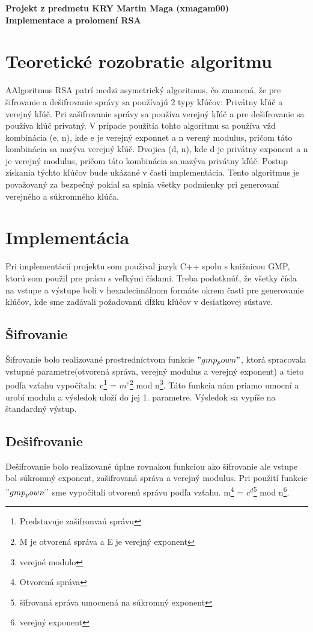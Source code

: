 \documentclass[11pt,a4paper,titlepage,final]{article}
\begin{document}
\raggedright\large{\textbf{Projekt z predmetu KRY Martin Maga (xmagam00) \\Implementace a prolomení RSA}}

\section{Teoretické rozobratie algoritmu}
AAlgoritmus RSA patrí medzi asymetrický algoritmus, čo znamená, že pre šifrovanie a dešifrovanie správy sa používajú 2 typy kľúčov: Privátny kľúč a verejný kľúč. Pri zašifrovanie správy sa používa verejný kľúč a pre dešifrovanie sa používa klúč privatný. V prípade použitia tohto algoritmu sa používa vžd kombinácia (e, n), kde e je verejný exponnet a n verený modulus, pričom táto kombinácia sa nazýva verejný kľúč. Dvojica (d, n), kde d je privátny exponent a n je verejný modulus, pričom táto kombinácia sa nazýva privátny kľúč. Postup získania týchto kľúčov bude ukázané v časti implementácia. Tento algoritmus je považovaný za bezpečný pokiaľ sa splnia všetky podmienky pri generovaní verejného a súkromného klúča.

\section{Implementácia}
Pri implementácií projektu som použival jazyk C++ spolu s knižnicou GMP, ktorú som použil pre prácu s veľkými číslami. Treba podotknúť, že všetky čísla na vstupe a výstupe boli v hexadecimálnom formáte okrem časti pre generovanie klúčov, kde sme zadávali požadovanú dĺžku klúčov v desiatkovej sústave.
\subsection{Šifrovanie}
Šifrovanie bolo realizované prostredníctvom funkcie $"gmp_pown"$, ktorá spracovala vstupné parametre(otvorená správa, verejný modulus a verejný exponent) a tieto podľa vzťahu vypočítala: c\footnote{Predstavuje zašifronvaú správu} = $m^e$\footnote{M je otvorená správa a E je verejný exponent} mod n\footnote{verejné modulo}. Táto funkcia nám priamo umocní a urobí modulu a výsledok uloží do jej 1. parametre. Výsledok sa vypíše na štandardný výstup. 
\subsection{Dešifrovanie}
Dešifrovanie bolo realizované úplne rovnakou funkciou ako šifrovanie ale vstupe bol súkromný exponent, zašifrovaná správa a verejný modulus. Pri použití funkcie $"gmp_pown"$ sme vypočítali otvorenú správu podľa vzťahu. m\footnote{Otvorená správa} = $c^d$\footnote{šifrovaná správa umocnená na súkromný exponent} mod n\footnote{verejný exponent}.
\end{document}
